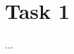 \documentclass[a4paper, 11pt]{article}
\theoremstyle{definition}
\theoremstyle{remark}
\begin{document}
\section*{Task 1}
  ...
\end{document}
